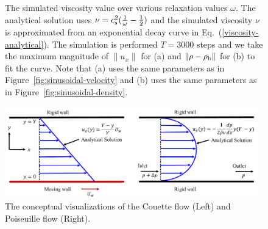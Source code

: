 \begin{figure}[H]
  \begin{center}
    \caption{The simulated viscosity value 
    over various relaxation values $\omega$.
    The analytical solution uses $\nu = c_{\rm s}^2(\frac{1}{\omega} - \frac{1}{2})$
    and the simulated viscosity $\nu$ is approximated from an exponential decay curve in Eq.~(\ref{viscosity-analytical}).
    The simulation is performed $T = 3000$ steps
    and we take the maximum magnitude of
    $\| u_x \|$ for (a) and $\| \rho - \rho_{\rm b} \|$ for (b)
    to fit the curve.
    Note that (a) uses the same parameters as in 
    Figure~\ref{fig:sinusoidal-velocity}
    and (b) uses the same parameters as in
    Figure~\ref{fig:sinusoidal-density}.
    \label{fig:omega-vs-visc}}
  \end{center}
\end{figure}

\begin{figure}[H]
  \centering
  \includegraphics[width=0.98\textwidth]{imgs/couette_and_poiseuille.pdf}
  \vspace{-3mm}
  \caption{The conceptual visualizations of the Couette flow (Left) and
  Poiseuille flow (Right).}
  \vspace{-3mm}
  \label{couette-and-poiseuille-conceptual}
\end{figure}


